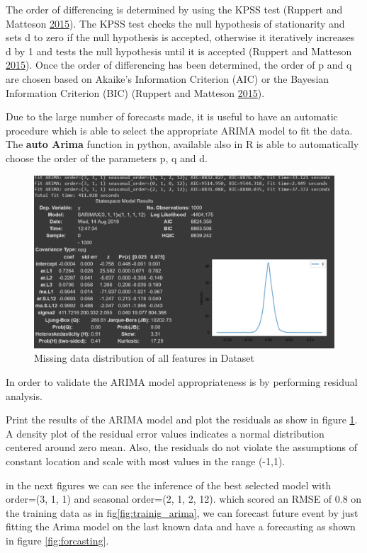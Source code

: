 The order of differencing is determined by using the KPSS test (Ruppert and Matteson \protect\hyperlink{ref-ruppert2015}{2015}). The KPSS test checks the null hypothesis of stationarity and sets d to zero if the null hypothesis is accepted, otherwise it iteratively increases d by 1 and tests the null hypothesis until it is accepted (Ruppert and Matteson \protect\hyperlink{ref-ruppert2015}{2015}). Once the order of
differencing has been determined, the order of p and q are chosen based on Akaike's Information Criterion (AIC) or the Bayesian Information Criterion (BIC) (Ruppert and Matteson \protect\hyperlink{ref-ruppert2015}{2015}).


Due to the large number of forecasts made, it is useful to have an
automatic procedure which is able to select the appropriate ARIMA model to fit the data. The \textbf{auto Arima} function in python, available also in R  is able to automatically choose the order of the parameters p, q and d.


\begin{figure}[H]
\centering
\includegraphics[scale=.6]{img/arima_degrees.PNG} 
\caption{Missing data distribution of all features in Dataset}
\label{fig:arima_degree}
\end{figure}

In order to validate the ARIMA model appropriateness is by performing residual analysis.

Print the results of the ARIMA model and plot the residuals as show in figure \ref{fig:arima_degree}. A density plot of the residual error values indicates a normal distribution centered around zero mean. Also, the residuals do not violate the assumptions of constant location and scale with most values in the range (-1,1).



in the next figures we can see the inference of  the best selected model with order=(3, 1, 1) and seasonal order=(2, 1, 2, 12). which scored an RMSE of 0.8 on the training data as in fig\ref{fig:trainig_arima}, we can forecast future event by just fitting the Arima model on the last  known data and have a forecasting as shown in figure \ref{fig:forcasting}.  


